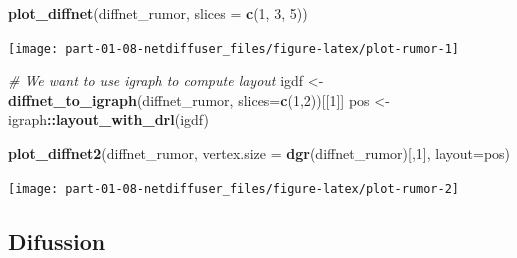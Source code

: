 \documentclass[]{book}
\newenvironment{Shaded}{\begin{snugshade}}{\end{snugshade}}
\newcommand{\CommentTok}[1]{\textcolor[rgb]{0.56,0.35,0.01}{\textit{#1}}}
\newcommand{\ControlFlowTok}[1]{\textcolor[rgb]{0.13,0.29,0.53}{\textbf{#1}}}
\newcommand{\DataTypeTok}[1]{\textcolor[rgb]{0.13,0.29,0.53}{#1}}
\newcommand{\DecValTok}[1]{\textcolor[rgb]{0.00,0.00,0.81}{#1}}
\newcommand{\KeywordTok}[1]{\textcolor[rgb]{0.13,0.29,0.53}{\textbf{#1}}}
\newcommand{\NormalTok}[1]{#1}
\newcommand{\OperatorTok}[1]{\textcolor[rgb]{0.81,0.36,0.00}{\textbf{#1}}}
\newcommand{\OtherTok}[1]{\textcolor[rgb]{0.56,0.35,0.01}{#1}}
\newcommand{\StringTok}[1]{\textcolor[rgb]{0.31,0.60,0.02}{#1}}
\begin{document}
\begin{Shaded}
\begin{Highlighting}[]
\KeywordTok{plot_diffnet}\NormalTok{(diffnet_rumor, }\DataTypeTok{slices =} \KeywordTok{c}\NormalTok{(}\DecValTok{1}\NormalTok{, }\DecValTok{3}\NormalTok{, }\DecValTok{5}\NormalTok{))}
\end{Highlighting}
\end{Shaded}

\begin{center}\texttt{[image: part-01-08-netdiffuser\_files/figure-latex/plot-rumor-1]} \end{center}

\begin{Shaded}
\begin{Highlighting}[]
\CommentTok{# We want to use igraph to compute layout}
\NormalTok{igdf <-}\StringTok{ }\KeywordTok{diffnet_to_igraph}\NormalTok{(diffnet_rumor, }\DataTypeTok{slices=}\KeywordTok{c}\NormalTok{(}\DecValTok{1}\NormalTok{,}\DecValTok{2}\NormalTok{))[[}\DecValTok{1}\NormalTok{]]}
\NormalTok{pos <-}\StringTok{ }\NormalTok{igraph}\OperatorTok{::}\KeywordTok{layout_with_drl}\NormalTok{(igdf)}

\KeywordTok{plot_diffnet2}\NormalTok{(diffnet_rumor, }\DataTypeTok{vertex.size =} \KeywordTok{dgr}\NormalTok{(diffnet_rumor)[,}\DecValTok{1}\NormalTok{], }\DataTypeTok{layout=}\NormalTok{pos)}
\end{Highlighting}
\end{Shaded}

\begin{center}\texttt{[image: part-01-08-netdiffuser\_files/figure-latex/plot-rumor-2]} \end{center}

\hypertarget{difussion}{%
\subsection{Difussion}\label{difussion}}

\begin{Shaded}
\end{Shaded}
\end{document}
